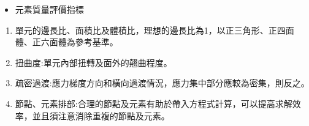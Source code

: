 \begin{itemize}
\item 元素質量評價指標
\end{itemize}
\begin{enumerate}
\item 單元的邊長比、面積比及體積比，理想的邊長比為1，以正三角形、正四面體、正六面體為參考基準。
\item 扭曲度:單元內部扭轉及面外的翹曲程度。
\item 疏密過渡:應力梯度方向和橫向過渡情況，應力集中部分應較為密集，則反之。
\item 節點、元素排部:合理的節點及元素有助於帶入方程式計算，可以提高求解效率，並且須注意消除重複的節點及元素。
\end{enumerate}
\newpage

